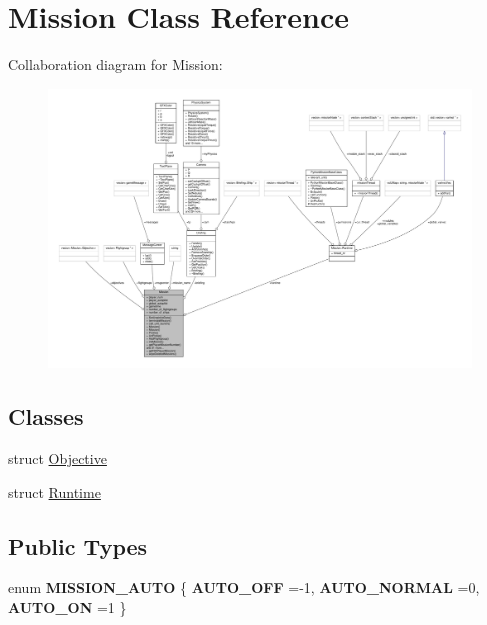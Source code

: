\hypertarget{classMission}{}\section{Mission Class Reference}
\label{classMission}


Collaboration diagram for Mission\+:
\nopagebreak
\begin{figure}[H]
\begin{center}
\leavevmode
\includegraphics[width=350pt]{d5/d7e/classMission__coll__graph}
\end{center}
\end{figure}
\subsection*{Classes}
\begin{DoxyCompactItemize}
\item 
struct \hyperlink{structMission_1_1Objective}{Objective}
\item 
struct \hyperlink{structMission_1_1Runtime}{Runtime}
\end{DoxyCompactItemize}
\subsection*{Public Types}
\begin{DoxyCompactItemize}
\item 
enum {\bfseries M\+I\+S\+S\+I\+O\+N\+\_\+\+A\+U\+TO} \{ {\bfseries A\+U\+T\+O\+\_\+\+O\+FF} =-\/1, 
{\bfseries A\+U\+T\+O\+\_\+\+N\+O\+R\+M\+AL} =0, 
{\bfseries A\+U\+T\+O\+\_\+\+ON} =1
 \}\hypertarget{classMission_a01158d0afcb5462499845949b91e8c11}{}\label{classMission_a01158d0afcb5462499845949b91e8c11}

\end{DoxyCompactItemize}
